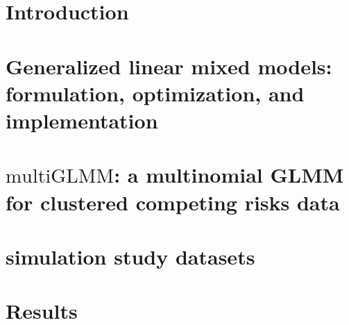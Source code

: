 \documentclass[12pt, %
               openright, %
               oneside, %
               a4paper, %
               chapter=TITLE, %
               section=TITLE, %
               brazil,
               english %
]{abntex2}
\begin{document}
\tableofcontents*
\cleardoublepage
\textual
\chapter{Introduction}
\label{cap:intro}

\chapter{Generalized linear mixed models: formulation, optimization, and
  implementation}
\label{cap:methods}

\chapter{\(\text{multiGLMM}\): a multinomial GLMM for clustered
  competing risks data}
\label{cap:model}

\chapter{simulation study datasets}
\label{cap:datasets}

\chapter{Results}
\label{cap:results}

\end{document}
